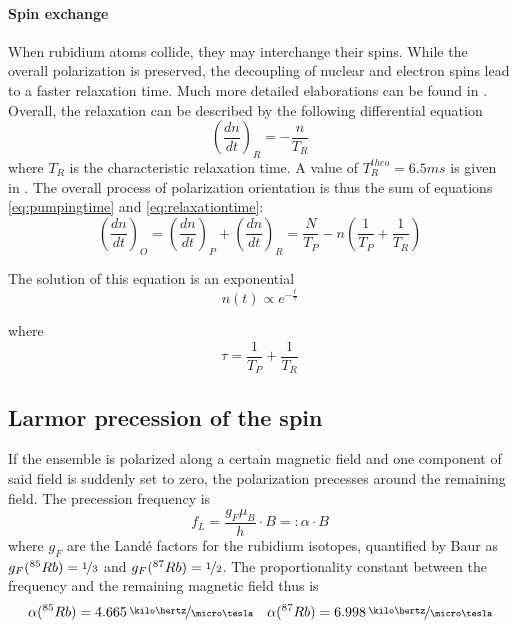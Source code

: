 \paragraph{Spin exchange}
When rubidium atoms collide, they may interchange their spins. While the overall polarization is preserved, the decoupling of nuclear and electron spins lead to a faster relaxation time. Much more detailed elaborations can be found in \cite{happer}.\\

Overall, the relaxation can be described by the following differential equation
\begin{equation}
\left(\frac{dn}{dt}\right)_R=-\frac{n}{T_R}
\label{eq:relaxationtime}
\end{equation}
where $T_R$ is the characteristic relaxation time. A value of $T^{theo}_R=\unit{6.5}{ms}$ is given in \cite{staatsex}. The overall process of polarization orientation is thus the sum of equations \ref{eq:pumpingtime} and \ref{eq:relaxationtime}:
\begin{equation}
\left(\frac{dn}{dt}\right)_O=\left(\frac{dn}{dt}\right)_P+\left(\frac{dn}{dt}\right)_R=\frac{N}{T_P}-n\left(\frac{1}{T_P}+\frac{1}{T_R}\right)
\end{equation}

The solution of this equation is an exponential
\begin{equation}
n(t)\propto e^{-\frac{t}{\tau}}
\label{eq:orientationexponential}
\end{equation}

where 
\begin{equation}
\tau=\frac{1}{T_P}+\frac{1}{T_R}\label{eq:tauIrelation}
\end{equation}
\subsection{Larmor precession of the spin}
If the ensemble is polarized along a certain magnetic field and one component of said field is suddenly set to zero, the polarization precesses around the remaining field. The precession frequency is
\begin{equation}
f_L=\frac{g_F\mu_B}{h}\cdot B =: \alpha\cdot B
\label{eq:precessionfreq}
\end{equation}
where $g_F$ are the Landé factors for the rubidium isotopes, quantified by Baur \cite{staatsex} as $g_F(^{85}Rb)=\nicefrac{1}{3}$ and $g_F(^{87}Rb)=\nicefrac{1}{2}$. The proportionality constant between the frequency and the remaining magnetic field thus is 
\begin{equation}
\alpha(^{85}Rb)=\unitfrac[4.665]{\kilo\hertz}{\micro\tesla}\quad \alpha(^{87}Rb)=\unitfrac[6.998]{\kilo\hertz}{\micro\tesla}
\end{equation}

